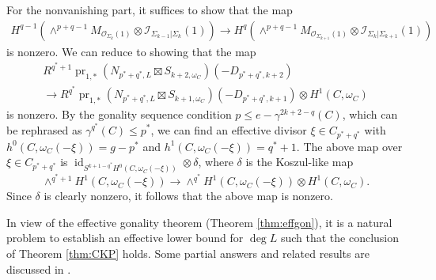 \documentclass[graybox]{svmult}
\newcommand{\sO}{\mathscr{O}}
\newcommand{\sI}{\mathscr{I}}
\def\id{\operatorname{id}}
\DeclareMathOperator{\pr}{pr}
\begin{document}
For the nonvanishing part, it suffices to show that the map
$$
\begin{array}{l}
H^{q-1}(\wedge^{p+q-1}M_{\sO_{\Sigma_k}(1)}\otimes \sI_{\Sigma_{k-1}|\Sigma_k}(1)) 
\longrightarrow H^q(\wedge^{p+q-1}M_{\sO_{\Sigma_{k+1}}(1)}\otimes \sI_{\Sigma_k|\Sigma_{k+1}}(1))
\end{array}
$$
is nonzero. We can reduce to showing that the map
$$
\begin{array}{l}
R^{q^*+1} \pr_{1,*} (N_{p^*+q^*,L} \boxtimes S_{k+2, \omega_C})(-D_{p^*+q^*,k+2}) \\
 \longrightarrow R^{q^*} \pr_{1,*} (N_{p^*+q^*,L} \boxtimes S_{k+1, \omega_C})(-D_{p^*+q^*,k+1}) \otimes H^1(C, \omega_C)
 \end{array}
$$
is nonzero. By the gonality sequence condition $p \leq e-\gamma^{2k+2-q}(C)$, which can be rephrased as $\gamma^{q^*}(C) \leq p^*$, we can find an effective divisor $\xi \in C_{p^*+q^*}$ with $h^0(C, \omega_C(-\xi)) = g-p^*$ and $h^1(C, \omega_C(-\xi)) = q^*+1$. The above map over $\xi \in C_{p^* + q^*}$ is $\id_{S^{k+1-q^*} H^0(C, \omega_C(-\xi))} \otimes \delta$, where $\delta$ is the Koszul-like map
$$
\wedge^{q^*+1} H^1(C, \omega_C(-\xi)) \longrightarrow \wedge^{q^*} H^1(C, \omega_C(-\xi)) \otimes H^1(C, \omega_C).
$$
Since $\delta$ is clearly nonzero, it follows that the above map is nonzero.

In view of the effective gonality theorem (Theorem \ref{thm:effgon}), it is a natural problem to establish an effective lower bound for $\deg L$ such that the conclusion of Theorem \ref{thm:CKP} holds. Some partial answers and related results are discussed in \cite[Section 5]{CKP}.




\end{document}
